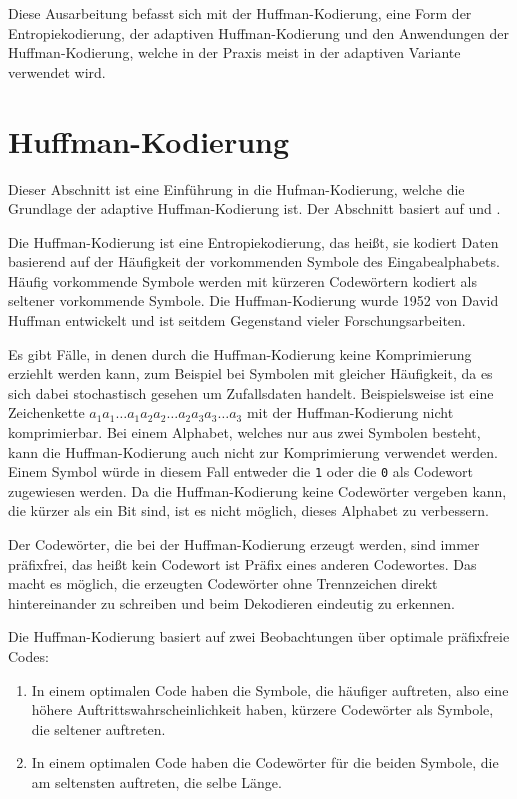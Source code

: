 \documentclass[twoside,11pt,a4paper]{article}
\theoremstyle{break}
\begin{document}
Diese Ausarbeitung befasst sich mit der Huffman-Kodierung, eine Form
der Entropiekodierung, der adaptiven Huffman-Kodierung und den
Anwendungen der Huffman-Kodierung, welche in der Praxis meist in der
adaptiven Variante verwendet wird.

\section{Huffman-Kodierung} \label{sec:huffman}
Dieser Abschnitt ist eine Einführung in die Hufman-Kodierung, welche
die Grundlage der adaptive Huffman-Kodierung ist. Der Abschnitt
basiert auf \cite{Salomon:2010} und \cite{Sayood:2006}.

Die Huffman-Kodierung ist eine Entropiekodierung, das heißt, sie
kodiert Daten basierend auf der Häufigkeit der vorkommenden Symbole
des Eingabealphabets. Häufig vorkommende Symbole werden mit kürzeren
Codewörtern kodiert als seltener vorkommende Symbole. Die
Huffman-Kodierung wurde 1952 von David Huffman entwickelt und ist
seitdem Gegenstand vieler Forschungsarbeiten.

Es gibt Fälle, in denen durch die Huffman-Kodierung keine
Komprimierung erziehlt werden kann, zum Beispiel bei Symbolen mit
gleicher Häufigkeit, da es sich dabei stochastisch gesehen um
Zufallsdaten handelt. Beispielsweise ist eine Zeichenkette
$a_1a_1{\dots}a_1a_2a_2{\dots}a_2a_3a_3{\dots}a_3$ mit der
Huffman-Kodierung nicht komprimierbar. Bei einem Alphabet, welches nur
aus zwei Symbolen besteht, kann die Huffman-Kodierung auch nicht zur
Komprimierung verwendet werden. Einem Symbol würde in diesem Fall
entweder die {\tt1} oder die {\tt0} als Codewort zugewiesen werden.
Da die Huffman-Kodierung keine Codewörter vergeben kann, die kürzer
als ein Bit sind, ist es nicht möglich, dieses Alphabet zu verbessern.

Der Codewörter, die bei der Huffman-Kodierung erzeugt werden, sind
immer präfixfrei, das heißt kein Codewort ist Präfix eines anderen
Codewortes. Das macht es möglich, die erzeugten Codewörter ohne
Trennzeichen direkt hintereinander zu schreiben und beim Dekodieren
eindeutig zu erkennen.

Die Huffman-Kodierung basiert auf zwei Beobachtungen über optimale
präfixfreie Codes:

\begin{enumerate}
\item In einem optimalen Code haben die Symbole, die häufiger
  auftreten, also eine höhere Auftrittswahrscheinlichkeit haben,
  kürzere Codewörter als Symbole, die seltener auftreten.
\item In einem optimalen Code haben die Codewörter für die beiden
  Symbole, die am seltensten auftreten, die selbe Länge.
\end{enumerate}
\end{document}
